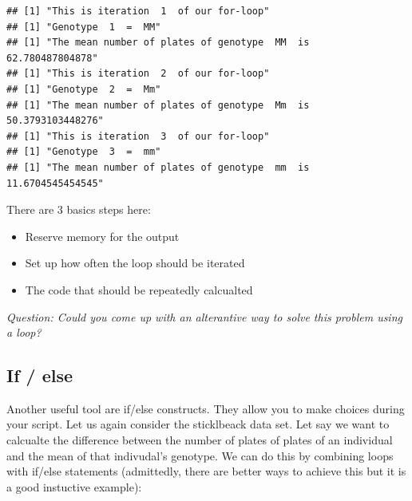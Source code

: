\documentclass[]{article}
\providecommand{\tightlist}{%
  \setlength{\itemsep}{0pt}\setlength{\parskip}{0pt}}
\begin{document}
\begin{verbatim}
## [1] "This is iteration  1  of our for-loop"
## [1] "Genotype  1  =  MM"
## [1] "The mean number of plates of genotype  MM  is  62.780487804878"
## [1] "This is iteration  2  of our for-loop"
## [1] "Genotype  2  =  Mm"
## [1] "The mean number of plates of genotype  Mm  is  50.3793103448276"
## [1] "This is iteration  3  of our for-loop"
## [1] "Genotype  3  =  mm"
## [1] "The mean number of plates of genotype  mm  is  11.6704545454545"
\end{verbatim}

There are 3 basics steps here:

\begin{itemize}
\tightlist
\item
  Reserve memory for the output
\item
  Set up how often the loop should be iterated
\item
  The code that should be repeatedly calcualted
\end{itemize}

\emph{Question: Could you come up with an alterantive way to solve this
problem using a loop?}

\hypertarget{if-else}{%
\subsection{If / else}\label{if-else}}

Another useful tool are if/else constructs. They allow you to make
choices during your script. Let us again consider the sticklbeack data
set. Let say we want to calcualte the difference between the number of
plates of plates of an individual and the mean of that indivudal's
genotype. We can do this by combining loops with if/else statements
(admittedly, there are better ways to achieve this but it is a good
instuctive example):
\end{document}
